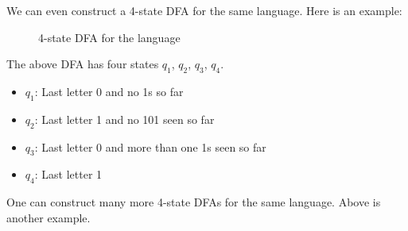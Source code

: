 \documentclass[english, 11pt]{article}
\begin{document}
We can even construct a 4-state DFA for the same language. Here is an example:

\begin{figure}[htbp]
\begin{center}
\end{center}
\caption{4-state DFA for the language}
\label{fig:4state}
\end{figure}


The above DFA has four states $q_1$, $q_2$, $q_3$, $q_4$.
\begin{itemize}
    \item $q_1$: Last letter 0 and no 1s so far
    \item $q_2$: Last letter 1 and no 101 seen so far
    \item $q_3$: Last letter 0 and more than one 1s seen so far
    \item $q_4$: Last letter 1
\end{itemize}


One can construct many more 4-state DFAs for the same language. Above is another example.
\end{document}
